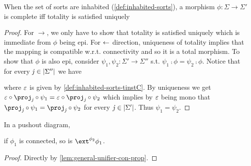 \begin{lemma}\label{lem:compl-utotal-famC-tinstC}
    When the set of sorts are inhabited (\cref{def:inhabited-sorts}),
    a morphism $\phi : \Sigma \to \Sigma'$ is complete iff totality is satisfied uniquely
    \begin{center}
    \end{center}
\end{lemma}
\begin{proof}
    For $\to$, we only have to show that totality is satisfied uniquely which is immediate from $\phi$ being epi.
    \nl
    For $\leftarrow$ direction, uniqueness of totality implies that the mapping is compatible w.r.t. connectivity and so it is a total morphism.  
    To show that $\phi$ is also epi, consider $\psi_1, \psi_2 : \Sigma' \to \Sigma''$ s.t. $\psi_1 \comp \phi = \psi_2 \comp \phi$.
    Notice that for every $\mathit{j} \in |{\Sigma''}|$ we have
    \begin{center}
    \end{center}
    where $\varepsilon$ is given by \cref{def:inhabited-sorts-tinstC}.
    By uniqueness we get $\me \comp \proj_\vj \comp \psi_1 = \me \comp \proj_\vj \comp \psi_2$ which implies by $\varepsilon$ being mono that
    $\proj_\vj \comp \psi_1 = \proj_\vj \comp \psi_2$ for every $\mathit{j} \in |{\Sigma'}|$.
    Thus $\psi_1 = \psi_2$.
\end{proof}

\begin{lemma}\label{lem:con-pushout}
    In a pushout diagram, 
    if $\phi_1$ is connected, so is $\ext^{\phi_2}\phi_1$.
\end{lemma}
\begin{proof}
    Directly by \cref{lem:general-unifier-con-prop}.
\end{proof}

